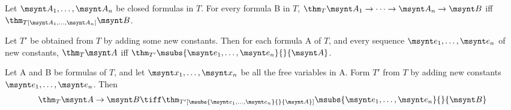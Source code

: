 \begin{corollary}
	Let $\msynt A_1,\dots,\msynt A_n$ be closed formulas in $T$. For every
	formula \synt B in $T$, $\thm_T\msynt A_1\to\dots\to\msynt A_n\to\msynt B$
	iff $\thm_{T[\msynt A_1,\dots,\msynt A_n]}\msynt B$.
\end{corollary}

\begin{theorem}
	Let $T'$ be obtained from $T$ by adding some new constants. Then for each formula
	\synt A of $T$, and every sequence $\msynt e_1,\dots,\msynt e_n$ of new
	constants, $\thm_T \msynt A$ iff
	 $\thm_{T'} \msubs{\msynt e_1,\dots,\msynt e_n}{}{\msynt A}$.
\end{theorem}

\begin{fact}
	Let \synt A and \synt B be formulas of $T$, and let $\msynt x_1,\dots,\msynt x_n$
	be all the free variables in \synt A. Form $T'$ from $T$ by adding new constants
	$\msynt e_1,\dots,\msynt e_n$. Then
	\[\thm_T \msynt A\to\msynt B \tiff \thm_{T'[\msubs{\msynt e_1,\dots,\msynt e_n}{}{\msynt A}]}
	\msubs{\msynt e_1,\dots,\msynt e_n}{}{\msynt B}\]
\end{fact}